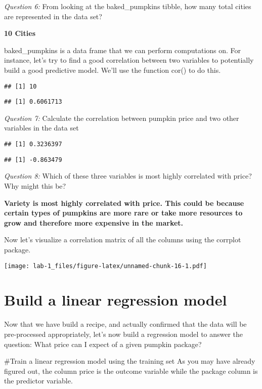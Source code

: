 \documentclass[
]{article}
\begin{document}
\emph{Question 6:} From looking at the baked\_pumpkins tibble, how many
total cities are represented in the data set?

\textbf{10 Cities}

baked\_pumpkins is a data frame that we can perform computations on. For
instance, let's try to find a good correlation between two variables to
potentially build a good predictive model. We'll use the function cor()
to do this.

\begin{verbatim}
## [1] 10
\end{verbatim}

\begin{verbatim}
## [1] 0.6061713
\end{verbatim}

\emph{Question 7:} Calculate the correlation between pumpkin price and
two other variables in the data set

\begin{verbatim}
## [1] 0.3236397
\end{verbatim}

\begin{verbatim}
## [1] -0.863479
\end{verbatim}

\emph{Question 8:} Which of these three variables is most highly
correlated with price? Why might this be?

\textbf{Variety is most highly correlated with price. This could be
because certain types of pumpkins are more rare or take more resources
to grow and therefore more expensive in the market.}

Now let's visualize a correlation matrix of all the columns using the
corrplot package.

\texttt{[image: lab-1\_files/figure-latex/unnamed-chunk-16-1.pdf]}

\hypertarget{build-a-linear-regression-model}{%
\section{Build a linear regression
model}\label{build-a-linear-regression-model}}

Now that we have build a recipe, and actually confirmed that the data
will be pre-processed appropriately, let's now build a regression model
to answer the question: What price can I expect of a given pumpkin
package?

\#Train a linear regression model using the training set As you may have
already figured out, the column price is the outcome variable while the
package column is the predictor variable.
\end{document}
